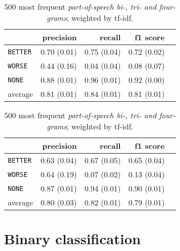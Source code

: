 \begin{table}[!htb]
    \begin{minipage}{.5\linewidth}
   \caption{ \emph{Mean Word Embeddings} for the middle part of the sentence. } 

\begin{tabular}{@{}lrrrr@{}}
\toprule
 	&	 precision &	 recall &	 f1 score  \\ \midrule 
\texttt{BETTER}	&	 0.70 \scriptsize{(0.01)} &	 0.75 \scriptsize{(0.04)} &	 0.72 \scriptsize{(0.02)}  \\ 
\texttt{WORSE}	&	 0.44 \scriptsize{(0.16)} &	 0.04 \scriptsize{(0.04)} &	 0.08 \scriptsize{(0.07)}  \\ 
\texttt{NONE}	&	 0.88 \scriptsize{(0.01)} &	 0.96 \scriptsize{(0.01)} &	 0.92 \scriptsize{(0.00)}  \\ 
average	&	 0.81 \scriptsize{(0.01)} &	 0.84 \scriptsize{(0.01)} &	 0.81 \scriptsize{(0.01)}  \\ 
\bottomrule
\end{tabular}
  \end{minipage} \hfill
    \begin{minipage}{.5\linewidth}
  
     \caption{500 most frequent \emph{part-of-speech bi-, tri- and four-grams}; weighted by tf-idf.} 
       \label{tbl:ngram_3}
\begin{tabular}{@{}lrrrr@{}}
\toprule
 	&	 precision &	 recall &	 f1 score  \\ \midrule 
\texttt{BETTER}	&	 0.63 \scriptsize{(0.04)} &	 0.67 \scriptsize{(0.05)} &	 0.65 \scriptsize{(0.04)}  \\ 
\texttt{WORSE}	&	 0.64 \scriptsize{(0.19)} &	 0.07 \scriptsize{(0.02)} &	 0.13 \scriptsize{(0.04)}  \\ 
\texttt{NONE}	&	 0.87 \scriptsize{(0.01)} &	 0.94 \scriptsize{(0.01)} &	 0.90 \scriptsize{(0.01)}  \\ 
average	&	 0.80 \scriptsize{(0.03)} &	 0.82 \scriptsize{(0.01)} &	 0.79 \scriptsize{(0.01)}  \\ 
\bottomrule
\end{tabular}
    \end{minipage} 
\end{table}








\section{Binary classification}
